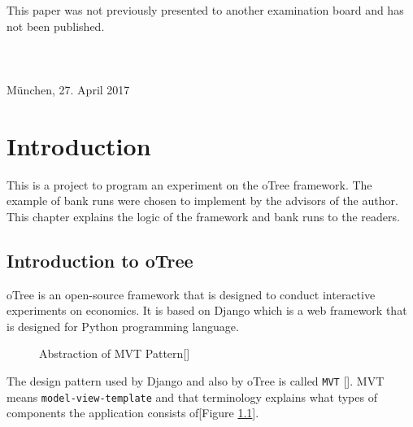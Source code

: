 This paper was not previously presented to another examination board and has not been published. \\\\\\\\

M\"{u}nchen, 27. April 2017

\newpage

\setcounter{page}{0} %
\pagestyle{headings}


\tableofcontents      %

\listoffigures

  

 


\chapter{Introduction } \label{cha:einleitung}

This is a project to program an experiment on the oTree framework. The example of bank runs were chosen to implement by the advisors of the author. This chapter explains the logic of the framework and bank runs to the readers.

\section{Introduction to oTree}\label{sec:intro}

oTree is an open-source framework that is designed to conduct interactive experiments on economics. It is based on Django which is a web framework that is designed for Python programming language.

\begin{figure}[h]
	\centerline{}
	\caption{Abstraction of MVT Pattern[\cite{DjangoOverview2017}]}
	\label{fig:picture2}
	
\end{figure}

The design pattern used by Django and also by oTree is called \verb|MVT| [\cite{DjangoOverview2017}]. MVT means \verb|model-view-template| and that terminology explains what types of components the application consists of[Figure \ref{fig:picture2}].  


